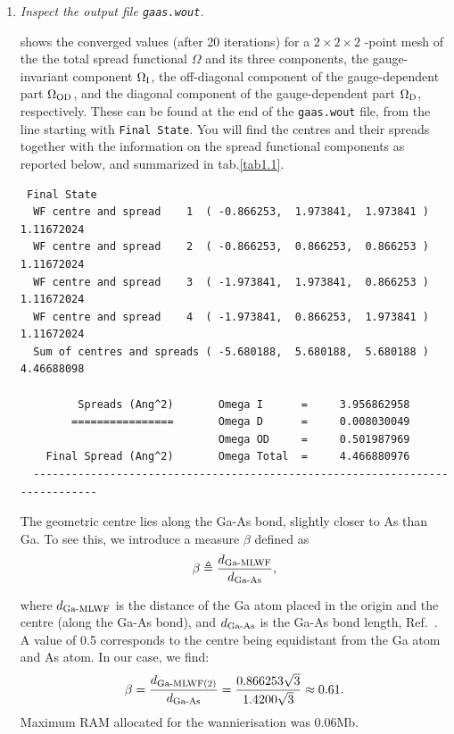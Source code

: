 \begin{enumerate}

\item {\it Inspect the output file {\tt gaas.wout}.}

 shows the converged values (after 20 iterations) for a $2\times2\times2$ \bfk-point mesh of the the total spread functional $\Omega$ and its three components, \ie{} the gauge-invariant component $\Omega\tinysub{I}$, the off-diagonal component of the gauge-dependent part $\Omega\tinysub{OD}$, and the diagonal component of the gauge-dependent part $\Omega\tinysub{D}$, respectively. These can be found at the end of the {\tt gaas.wout} file, from the line starting with {\tt Final State}. You will find the \MLWF{} centres and their spreads together with the information on the spread functional components as reported below, and summarized in tab.\ref{tab1.1}.
\begin{tcolorbox}[sharp corners,boxrule=0.5pt]
{\small
\begin{verbatim}
 Final State
  WF centre and spread    1  ( -0.866253,  1.973841,  1.973841 )     1.11672024
  WF centre and spread    2  ( -0.866253,  0.866253,  0.866253 )     1.11672024
  WF centre and spread    3  ( -1.973841,  1.973841,  0.866253 )     1.11672024
  WF centre and spread    4  ( -1.973841,  0.866253,  1.973841 )     1.11672024
  Sum of centres and spreads ( -5.680188,  5.680188,  5.680188 )     4.46688098
  
         Spreads (Ang^2)       Omega I      =     3.956862958
        ================       Omega D      =     0.008030049
                               Omega OD     =     0.501987969
    Final Spread (Ang^2)       Omega Total  =     4.466880976
  -----------------------------------------------------------------------------
\end{verbatim}
}
\end{tcolorbox}
The geometric centre lies along the Ga-As bond, slightly closer to As than Ga. To see this, we introduce a measure $\beta$ defined as 
$$\beta \triangleq \frac{d\tinysub{Ga-MLWF}}{d\tinysub{Ga-As}},$$

where $d\tinysub{Ga-MLWF}$ is the distance of the Ga atom placed in the origin and the \MLWF{} centre (along the Ga-As bond), and $d\tinysub{Ga-As}$ is the Ga-As bond length, \cf{} Ref.~\cite{marzarivanderbilt1997}. A value of 0.5 corresponds to the \MLWF{} centre being equidistant from the Ga atom and As atom. 
In our case, we find: $$\beta = \frac{d\tinysub{Ga-MLWF(2)}}{d\tinysub{Ga-As}} = \frac{0.866253\sqrt{3}}{1.4200\sqrt{3}} \approx 0.61 .$$
Maximum RAM allocated for the wannierisation was 0.06Mb.


\end{enumerate}
